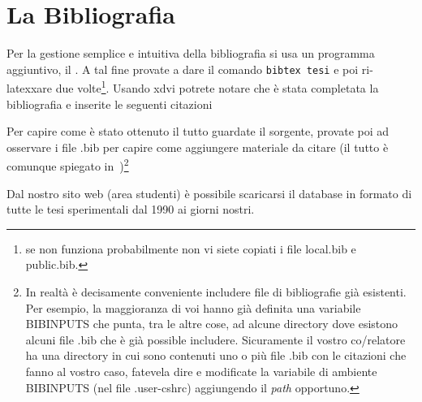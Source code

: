 \section{La Bibliografia}

   Per la gestione semplice e intuitiva della bibliografia si usa un programma
   aggiuntivo, il \BibTeX. A tal fine provate a dare il comando
   \texttt{bibtex tesi} e poi ri-latexxare due volte\footnote{se non funziona
   probabilmente non vi siete copiati i file local.bib e public.bib.}.
   Usando xdvi potrete notare che \`e stata completata la bibliografia
   e inserite le seguenti citazioni~\cite{sql,cv1,itsc99,mpi-boselli,mpipov,isata99,spie99,ipps99,iv98-1,iv98-2,spie98,isata97,iv97,camp97,canpc,ica3pp97,eusipco96,iv96,icip96}

   Per capire come \`e stato ottenuto il tutto guardate il sorgente, 
   provate poi ad osservare i file .bib per capire come aggiungere materiale da
   citare (il tutto \`e comunque spiegato in~\cite{btxdoc})\footnote{In realt\`a
   \`e decisamente conveniente includere file di bibliografie gi\`a esistenti.
   Per esempio,
   la maggioranza di voi hanno gi\`a definita una variabile BIBINPUTS che punta, tra le altre cose, ad
   alcune directory dove esistono alcuni file .bib che \`e gi\`a possible
   includere. Sicuramente il vostro co/relatore ha una directory in cui sono contenuti
   uno o pi\`u file .bib con le citazioni che fanno al vostro caso, fatevela dire
   e modificate la variabile di ambiente BIBINPUTS (nel file .user-cshrc) aggiungendo
   il \emph{path} opportuno.}

   Dal nostro sito web (area studenti) è possibile scaricarsi il database in formato \BibTeX di
   tutte le tesi sperimentali dal 1990 ai giorni nostri.
\fi


